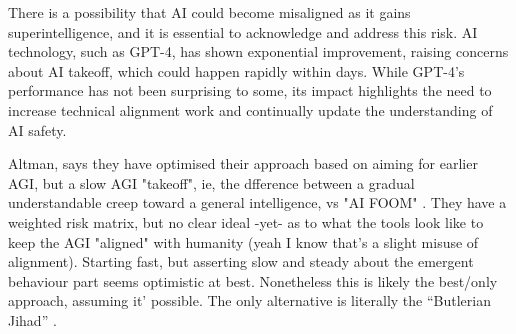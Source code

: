 There is a possibility that AI could become misaligned as it gains superintelligence, and it is essential to acknowledge and address this risk. 
AI technology, such as GPT-4, has shown exponential improvement, raising concerns about AI takeoff, which could happen rapidly within days. While GPT-4's performance has not been surprising to some, its impact highlights the need to increase technical alignment work and continually update the understanding of AI safety.\par
Altman, says they have optimised their approach based on aiming for earlier AGI, but a slow AGI "takeoff", ie, the dfference between a gradual understandable creep toward a general intelligence, vs "AI FOOM" \cite{yudkowsky2008hanson}. They have a weighted risk matrix, but no clear ideal -yet- as to what the tools look like to keep the AGI "aligned" with humanity (yeah I know that's a slight misuse of alignment). Starting fast, but asserting slow and steady about the emergent behaviour part seems optimistic at best. Nonetheless this is likely the best/only approach, assuming it' possible. The only alternative is literally the ``Butlerian Jihad'' \cite{song2018preventing}.
